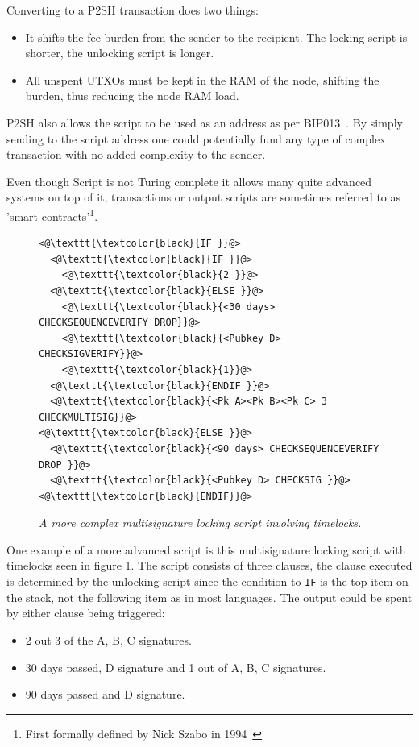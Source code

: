 Converting to a P2SH transaction does two things:

\begin{itemize}

	\item It shifts the fee burden from the sender to the recipient. The locking script is shorter, the unlocking script is longer.
	
	\item All unspent UTXOs must be kept in the RAM of the node, shifting the burden, thus reducing the node RAM load.
	
\end{itemize}

P2SH also allows the script to be used as an address as per BIP013~\cite{bip:0013:p2shaddr}. By simply sending to the script address one could potentially fund any type of complex transaction with no added complexity to the sender.

Even though Script is not Turing complete it allows many quite advanced systems on top of it, transactions or output scripts are sometimes referred to as 'smart contracts'\footnote{First formally defined by Nick Szabo in 1994~\cite{szabo:smart:contracts}}.

\begin{figure}[hbt!]
	
	\begin{lstlisting}	
<@\texttt{\textcolor{black}{IF }}@>
  <@\texttt{\textcolor{black}{IF }}@>
    <@\texttt{\textcolor{black}{2 }}@>
  <@\texttt{\textcolor{black}{ELSE }}@>
    <@\texttt{\textcolor{black}{<30 days> CHECKSEQUENCEVERIFY DROP}}@>
    <@\texttt{\textcolor{black}{<Pubkey D> CHECKSIGVERIFY}}@>
    <@\texttt{\textcolor{black}{1}}@>
  <@\texttt{\textcolor{black}{ENDIF }}@>
  <@\texttt{\textcolor{black}{<Pk A><Pk B><Pk C> 3 CHECKMULTISIG}}@>
<@\texttt{\textcolor{black}{ELSE }}@>
  <@\texttt{\textcolor{black}{<90 days> CHECKSEQUENCEVERIFY DROP }}@>
  <@\texttt{\textcolor{black}{<Pubkey D> CHECKSIG }}@>
<@\texttt{\textcolor{black}{ENDIF}}@>

	\end{lstlisting}
	
	\caption{\textit{ A more complex multisignature locking script involving timelocks.
	}}
	\label{fig:aantop:multi}
\end{figure}

One example of a more advanced script is this multisignature locking script with timelocks seen in figure \ref{fig:aantop:multi}. The script consists of three clauses, the clause executed is determined by the unlocking script since the condition to \texttt{IF} is the top item on the stack, not the following item as in most languages. The output could be spent by either clause being triggered:
\begin{itemize}
	\item 2 out 3 of the A, B, C signatures.
	\item 30 days passed, D signature and 1 out of A, B, C signatures.
	\item 90 days passed and D signature.
\end{itemize}

